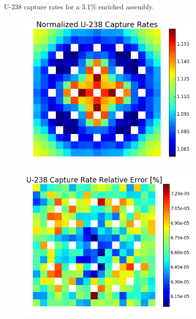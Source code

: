 \begin{figure}[h!]
\begin{subfigure}{0.5\textwidth}
  \caption{}
  \label{fig:chap7-capt-rate-rel-err-3.1-assm}
\end{subfigure}%
\caption[U-238 capture rates for a 3.1\% enriched assembly]{U-238 capture rates for a 3.1\% enriched assembly.}
\label{fig:chap7-capt-rates-3.1-assm}
\end{figure}

\begin{figure}[h!]
\centering
\begin{subfigure}{0.5\textwidth}
  \centering
  \includegraphics[width=\linewidth]{figures/benchmarks/capture-rates/capt-mean-fuel-31-20BAs}
  \caption{}
  \label{fig:chap7-capt-rate-mean-3.1-20BAs-assm}
\end{subfigure}%
\begin{subfigure}{0.5\textwidth}
  \centering
  \includegraphics[width=\linewidth]{figures/benchmarks/capture-rates/capt-rel-err-fuel-31-20BAs}

\end{subfigure}
\end{figure}
